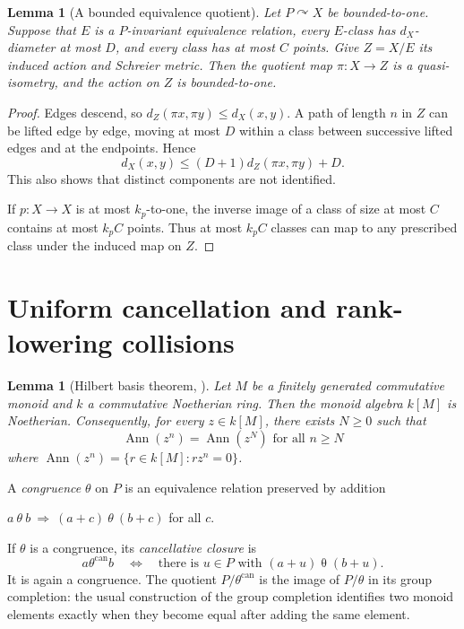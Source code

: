 \documentclass[10pt,a4paper]{amsart}
\newtheorem{lemma}[theorem]{Lemma}
\newcommand{\act}{\curvearrowright}
\begin{document}
\begin{lemma}[A bounded equivalence quotient]\label{lem:quotient}
Let $P\act X$ be bounded-to-one. Suppose that $E$ is a $P$-invariant
equivalence relation, every $E$-class has $d_X$-diameter at most $D$, and
every class has at most $C$ points. Give $Z=X/E$ its induced action and
Schreier metric. Then the quotient map $\pi:X\to Z$ is a quasi-isometry,
and the action on $Z$ is bounded-to-one.
\end{lemma}

\begin{proof}
Edges descend, so $d_Z(\pi x,\pi y)\le d_X(x,y)$. A path of length $n$
in $Z$ can be lifted edge by edge, moving at most $D$ within a class
between successive lifted edges and at the endpoints. Hence
\begin{equation}\label{eq:quotient-metric}
 d_X(x,y)\le (D+1)d_Z(\pi x,\pi y)+D.
\end{equation}
This also shows that distinct components are not identified.

If $p:X\to X$ is at most $k_p$-to-one, the inverse image of a class of
size at most $C$ contains at most $k_pC$ points. Thus at most $k_pC$
classes can map to any prescribed class under the induced map on $Z$.
\end{proof}

\section{Uniform cancellation and rank-lowering collisions}\label{sec:cancellation}

\begin{lemma}[Hilbert basis theorem, \cite{Stacks}]\label{Hilbert basis theorem}
   Let $M$ be a finitely generated commutative monoid and $k$ a commutative Noetherian ring. Then the monoid algebra $k[M]$ is Noetherian. Consequently, for every $z\in k[M]$, there exists $N\geq 0$ such that
$$\operatorname{Ann}(z^n)=\operatorname{Ann}(z^N)\text{ for all }n\geq N$$
where $\operatorname{Ann}(z^n)=\{r\in k[M]:rz^n=0\}$.
\end{lemma}

A \emph{congruence} $\theta$ on $P$ is an equivalence relation preserved by addition \begin{center}$a\ \theta\ b\ \Longrightarrow\ (a+c)\ \theta\ (b+c)$ for all $c$.\end{center} If
$\theta$ is a congruence, its \emph{cancellative closure} is
\begin{equation}\label{eq:can}
 a\mathrel{\theta^{\mathrm{can}}}b
 \quad\Longleftrightarrow\quad
 \text{there is }u\in P\text{ with }(a+u)\mathrel\theta (b+u).
\end{equation}
It is again a congruence. The quotient $P/\theta^{\mathrm{can}}$ is the
image of $P/\theta$ in its group completion: the usual construction of the
group completion identifies two monoid elements exactly when they become
equal after adding the same element.
\end{document}
